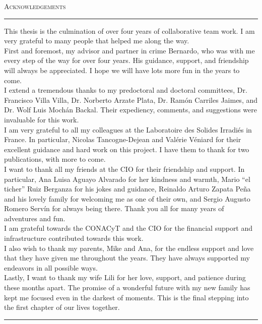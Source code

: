 \null
\vfill

\begin{center}

{\LARGE{\scshape Acknowledgements}}\\

\noindent\rule[2pt]{0.85\textwidth}{0.5pt}

\parbox{0.85\textwidth}{
This thesis is the culmination of over four years of collaborative team work. I
am very grateful to many people that helped me along the way.\\

First and foremost, my advisor and partner in crime Bernardo, who was with me
every step of the way for over four years. His guidance, support, and friendship
will always be appreciated. I hope we will have lots more fun in the years to
come.\\

I extend a tremendous thanks to my predoctoral and doctoral committees, Dr.
Francisco Villa Villa, Dr. Norberto Arzate Plata, Dr. Ram\'on Carriles Jaimes,
and Dr. Wolf Luis Moch\'an Backal. Their expediency, comments, and suggestions
were invaluable for this work.\\

I am very grateful to all my colleagues at the Laboratoire des Solides
Irradi\'es in France. In particular, Nicolas Tancogne-Dejean and Val\'erie
V\'eniard for their excellent guidance and hard work on this project. I have
them to thank for two publications, with more to come.\\

I want to thank all my friends at the CIO for their friendship and support. In
particular, Ana Luisa Aguayo Alvarado for her kindness and warmth, Mario ``el
ticher'' Ruiz Berganza for his jokes and guidance, Reinaldo Arturo Zapata Pe\~na
and his lovely family for welcoming me as one of their own, and Sergio Augusto
Romero Serv\'in for always being there. Thank you all for many years of
adventures and fun.\\

I am grateful towards the CONACyT and the CIO for the financial support and
infrastructure contributed towards this work.\\

I also wish to thank my parents, Mike and Ana, for the endless support and love
that they have given me throughout the years. They have always supported my
endeavors in all possible ways.\\

Lastly, I want to thank my wife Lili for her love, support, and patience during
these months apart. The promise of a wonderful future with my new family has
kept me focused even in the darkest of moments. This is the final stepping into
the first chapter of our lives together.}

\noindent\rule[2pt]{0.85\textwidth}{0.5pt}

\end{center}

\vfill

\cleardoublepage
